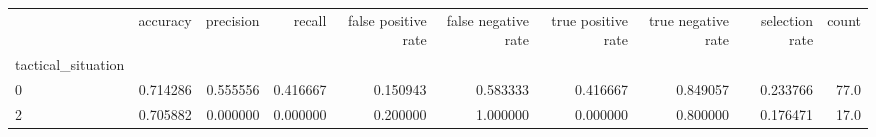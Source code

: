 \begin{tabular}{lrrrrrrrrr}
\toprule
{} &  accuracy &  precision &    recall &  false positive rate &  false negative rate &  true positive rate &  true negative rate &  selection rate &  count \\
tactical\_situation &           &            &           &                      &                      &                     &                     &                 &        \\
\midrule
0                  &  0.714286 &   0.555556 &  0.416667 &             0.150943 &             0.583333 &            0.416667 &            0.849057 &        0.233766 &   77.0 \\
2                  &  0.705882 &   0.000000 &  0.000000 &             0.200000 &             1.000000 &            0.000000 &            0.800000 &        0.176471 &   17.0 \\
\bottomrule
\end{tabular}
